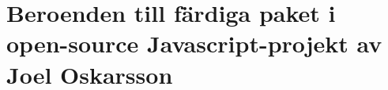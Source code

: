\chapter{Beroenden till färdiga paket i open-source Javascript-projekt av Joel Oskarsson}
\label{individual:joel_o}








